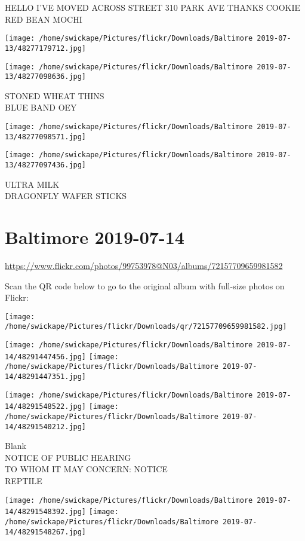 \documentclass[10pt,letterpaper]{article}
\begin{document}
HELLO I'VE MOVED ACROSS STREET 310 PARK AVE THANKS COOKIE\\
RED BEAN MOCHI
\pagebreak

\texttt{[image: /home/swickape/Pictures/flickr/Downloads/Baltimore 2019-07-13/48277179712.jpg]}

\vspace{0.25in}
\texttt{[image: /home/swickape/Pictures/flickr/Downloads/Baltimore 2019-07-13/48277098636.jpg]}

STONED WHEAT THINS\\
BLUE BAND OEY
\pagebreak

\texttt{[image: /home/swickape/Pictures/flickr/Downloads/Baltimore 2019-07-13/48277098571.jpg]}

\vspace{0.25in}
\texttt{[image: /home/swickape/Pictures/flickr/Downloads/Baltimore 2019-07-13/48277097436.jpg]}

ULTRA MILK\\
DRAGONFLY WAFER STICKS
\pagebreak

\section*{Baltimore 2019-07-14}

\url{https://www.flickr.com/photos/99753978@N03/albums/72157709659981582}

Scan the QR code below to go to the original album with full-size photos on Flickr:

\texttt{[image: /home/swickape/Pictures/flickr/Downloads/qr/72157709659981582.jpg]}
\pagebreak

\texttt{[image: /home/swickape/Pictures/flickr/Downloads/Baltimore 2019-07-14/48291447456.jpg]}
\texttt{[image: /home/swickape/Pictures/flickr/Downloads/Baltimore 2019-07-14/48291447351.jpg]}

\texttt{[image: /home/swickape/Pictures/flickr/Downloads/Baltimore 2019-07-14/48291548522.jpg]}
\texttt{[image: /home/swickape/Pictures/flickr/Downloads/Baltimore 2019-07-14/48291540212.jpg]}

Blank\\
NOTICE OF PUBLIC HEARING\\
TO WHOM IT MAY CONCERN: NOTICE\\
REPTILE
\pagebreak

\texttt{[image: /home/swickape/Pictures/flickr/Downloads/Baltimore 2019-07-14/48291548392.jpg]}
\texttt{[image: /home/swickape/Pictures/flickr/Downloads/Baltimore 2019-07-14/48291548267.jpg]}
\end{document}

